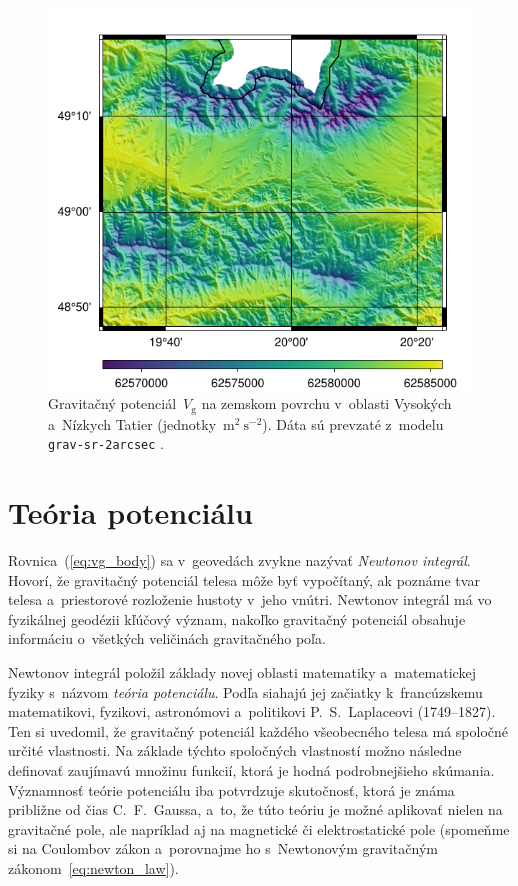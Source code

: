 \documentclass[a4paper, 12pt]{book}
\newcommand{\gidx}{\mathrm g}
\begin{document}
\begin{figure}
\centering
\includegraphics{./fig-vg-grav-sr-2arcsec.pdf}
\caption{Gravitačný potenciál~$V_\gidx$ na zemskom povrchu v~oblasti Vysokých
a~Nízkych Tatier (jednotky~$\mathrm{m}^2 \ \mathrm{s}^{-2}$).  Dáta sú prevzaté
z~modelu \texttt{grav-sr-2arcsec} \parencite{GravSR2arcsec}.}
\label{fig:vg_grav_sr_2arcsec}
\end{figure}






\section{Teória potenciálu}
\label{sec:potential_theory}

Rovnica~(\ref{eq:vg_body}) sa v~geovedách zvykne nazývať \emph{Newtonov
integrál}.  Hovorí, že gravitačný potenciál telesa môže byť vypočítaný, ak 
poznáme tvar telesa a~priestorové rozloženie hustoty v~jeho vnútri.  Newtonov
integrál má vo fyzikálnej geodézii kľúčový význam, nakoľko gravitačný potenciál 
obsahuje informáciu o~všetkých veličinách gravitačného poľa.

Newtonov integrál položil základy novej oblasti matematiky a~matematickej 
fyziky s~názvom \emph{teória potenciálu}.  Podľa \textcite{MacMillan1930} 
siahajú jej začiatky k~francúzskemu matematikovi, fyzikovi, astronómovi 
a~politikovi P.~S.~Laplaceovi (1749--1827).  Ten si uvedomil, že gravitačný 
potenciál každého všeobecného telesa má spoločné určité vlastnosti.  Na základe 
týchto spoločných vlastností možno následne definovať zaujímavú množinu 
funkcií, ktorá je hodná podrobnejšieho skúmania.  Významnosť teórie potenciálu 
iba potvrdzuje skutočnosť, ktorá je známa približne od čias C.~F.~Gaussa, a~to, 
že túto teóriu je možné aplikovať nielen na gravitačné pole, ale napríklad aj 
na magnetické či elektrostatické pole (spomeňme si na Coulombov zákon 
a~porovnajme ho s~Newtonovým gravitačným zákonom~\ref{eq:newton_law}).
\end{document}
